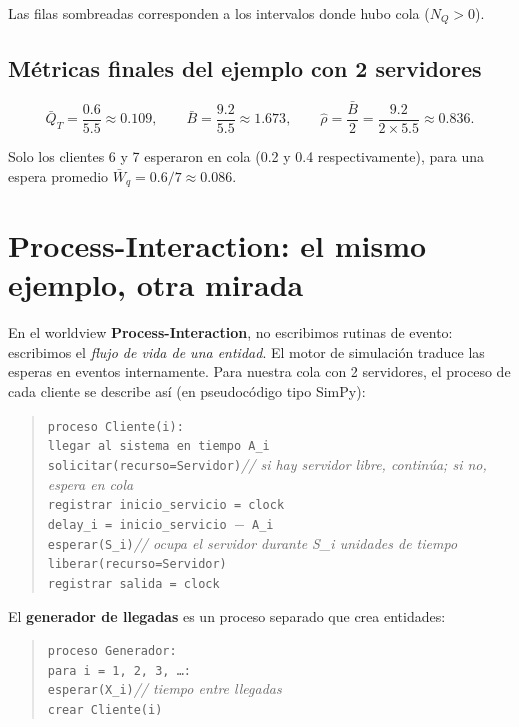 \documentclass[11pt, letterpaper]{article}
\begin{document}
Las filas sombreadas corresponden a los intervalos donde hubo cola ($N_Q > 0$).

\subsection{Métricas finales del ejemplo con 2 servidores}

\[
\bar{Q}_T = \frac{0.6}{5.5} \approx 0.109, \qquad \bar{B} = \frac{9.2}{5.5} \approx 1.673, \qquad \hat{\rho} = \frac{\bar{B}}{2} = \frac{9.2}{2 \times 5.5} \approx 0.836.
\]

Solo los clientes 6 y 7 esperaron en cola (0.2 y 0.4 respectivamente), para una espera promedio $\bar{W}_q = 0.6/7 \approx 0.086$.


\section{Process-Interaction: el mismo ejemplo, otra mirada}

En el worldview \textbf{Process-Interaction}, no escribimos rutinas de evento: escribimos el \emph{flujo de vida de una entidad}. El motor de simulación traduce las esperas en eventos internamente. Para nuestra cola con 2 servidores, el proceso de cada cliente se describe así (en pseudocódigo tipo SimPy):

\begin{quote}
\small
\texttt{proceso Cliente(i):}\\
\quad \texttt{llegar al sistema en tiempo A\_i}\\
\quad \texttt{solicitar(recurso=Servidor)}\quad \emph{// si hay servidor libre, continúa; si no, espera en cola}\\
\quad \texttt{registrar inicio\_servicio = clock}\\
\quad \texttt{delay\_i = inicio\_servicio $-$ A\_i}\\
\quad \texttt{esperar(S\_i)}\quad \emph{// ocupa el servidor durante S\_i unidades de tiempo}\\
\quad \texttt{liberar(recurso=Servidor)}\\
\quad \texttt{registrar salida = clock}
\end{quote}

El \textbf{generador de llegadas} es un proceso separado que crea entidades:

\begin{quote}
\small
\texttt{proceso Generador:}\\
\quad \texttt{para i = 1, 2, 3, \ldots:}\\
\quad\quad \texttt{esperar(X\_i)}\quad \emph{// tiempo entre llegadas}\\
\quad\quad \texttt{crear Cliente(i)}
\end{quote}
\end{document}
